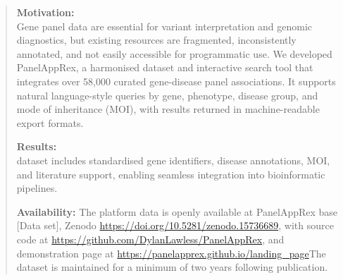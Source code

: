 \DIFdelend \clearpage
\begin{abstract}
\noindent \textbf{Motivation:}\\
Gene panel data are essential for variant interpretation and genomic diagnostics, but existing resources are fragmented, inconsistently annotated, and not easily accessible for programmatic use. 
We developed PanelAppRex, a harmonised dataset and interactive search tool that integrates over 58,000 curated gene-disease panel associations\DIFdelbegin {}\DIFdelend . It supports natural language-style queries by gene, phenotype, disease group, and mode of inheritance (MOI), with results returned in machine-readable export formats. 

\vspace{1em}
\DIFaddbegin 

\DIFaddend \noindent \textbf{Results:}\\
\DIFdelbegin {}\DIFdelend \DIFaddbegin {}\DIFaddend dataset includes standardised gene identifiers, disease annotations, MOI, and literature support, enabling seamless integration into bioinformatic pipelines. 
\DIFaddbegin {}\DIFaddend 

\vspace{1em}
\DIFaddbegin 

\DIFaddend \noindent \textbf{Availability:} The platform data is openly available at  PanelAppRex base [Data set], Zenodo \url{https://doi.org/10.5281/zenodo.15736689}, with
source code at \url{https://github.com/DylanLawless/PanelAppRex},
and demonstration page at \DIFdelbegin %
\DIFdelend \DIFaddbegin \url{https://panelapprex.github.io/landing_page}\DIFaddend The dataset is maintained for a minimum of two years following publication.
\end{abstract}
\clearpage

